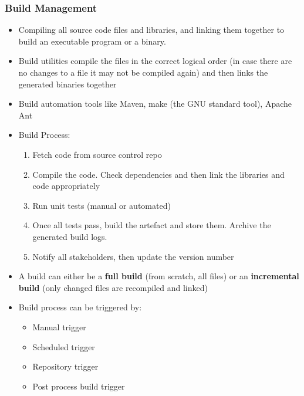 \documentclass{article}
\begin{document}
\subsubsection{Build Management}
\begin{itemize}
    \item Compiling all source code files and libraries, and linking them together to build an executable program or a binary. 
    
    \item Build utilities compile the files in the correct logical order (in case there are no changes to a file it may not be compiled again) and then links the generated binaries together
    
    \item Build automation tools like Maven, make (the GNU standard tool), Apache Ant
    
    \item Build Process:
    \begin{enumerate}
        \item Fetch code from source control repo
        
        \item Compile the code. Check dependencies and then link the libraries and code appropriately
        
        \item Run unit tests (manual or automated)
        
        \item Once all tests pass, build the artefact and store them. Archive the generated build logs. 
        
        \item Notify all stakeholders, then update the version number
    \end{enumerate}
    
    \item A build can either be a \textbf{full build} (from scratch, all files) or an \textbf{incremental build} (only changed files are recompiled and linked)
    
    \item Build process can be triggered by:
    \begin{itemize}
        \item Manual trigger
        
        \item Scheduled trigger
        
        \item Repository trigger 
        
        \item Post process build trigger
    \end{itemize}
\end{itemize}
\end{document}
